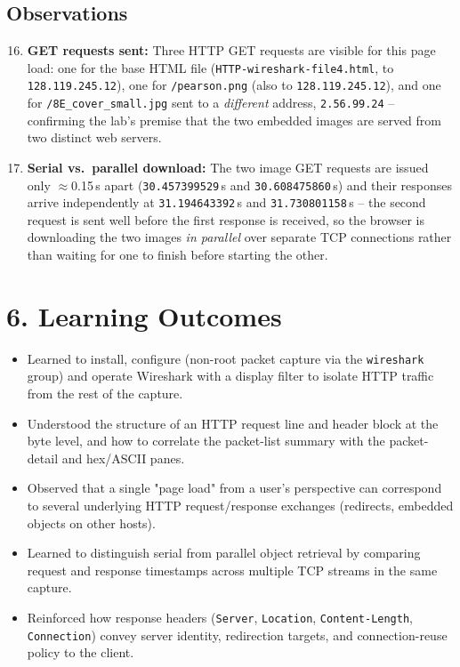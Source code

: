 \documentclass[11pt]{article}
\begin{document}
\subsection*{Observations}
\begin{enumerate}
  \setcounter{enumi}{15}
  \item \textbf{GET requests sent:} Three HTTP GET requests are visible for this page load: one
        for the base HTML file (\texttt{HTTP-wireshark-file4.html}, to \texttt{128.119.245.12}),
        one for \texttt{/pearson.png} (also to \texttt{128.119.245.12}), and one for
        \texttt{/8E\_cover\_small.jpg} sent to a \emph{different} address,
        \texttt{2.56.99.24} -- confirming the lab's premise that the two embedded images are
        served from two distinct web servers.
  \item \textbf{Serial vs.\ parallel download:} The two image GET requests are issued only
        $\approx$0.15\,s apart (\texttt{30.457399529}\,s and \texttt{30.608475860}\,s) and their
        responses arrive independently at \texttt{31.194643392}\,s and \texttt{31.730801158}\,s --
        the second request is sent well before the first response is received, so the browser is
        downloading the two images \emph{in parallel} over separate TCP connections rather than
        waiting for one to finish before starting the other.
\end{enumerate}

\section*{6. Learning Outcomes}
\begin{itemize}
  \item Learned to install, configure (non-root packet capture via the \texttt{wireshark} group)
        and operate Wireshark with a display filter to isolate HTTP traffic from the rest of the
        capture.
  \item Understood the structure of an HTTP request line and header block at the byte level, and
        how to correlate the packet-list summary with the packet-detail and hex/ASCII panes.
  \item Observed that a single "page load" from a user's perspective can correspond to several
        underlying HTTP request/response exchanges (redirects, embedded objects on other hosts).
  \item Learned to distinguish serial from parallel object retrieval by comparing request and
        response timestamps across multiple TCP streams in the same capture.
  \item Reinforced how response headers (\texttt{Server}, \texttt{Location}, \texttt{Content-Length},
        \texttt{Connection}) convey server identity, redirection targets, and connection-reuse
        policy to the client.
\end{itemize}
\end{document}
